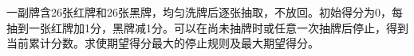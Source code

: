 一副牌含26张红牌和26张黑牌，均匀洗牌后逐张抽取，不放回。初始得分为0，每抽到一张红牌加1分，黑牌减1分。可以在尚未抽牌时或任意一次抽牌后停止，得到当前累计分数。求使期望得分最大的停止规则及最大期望得分。
